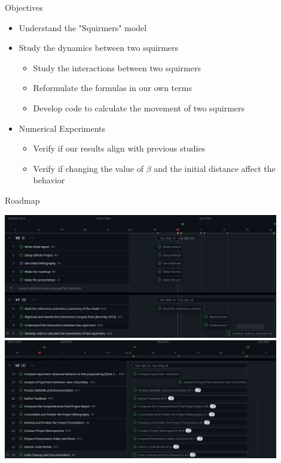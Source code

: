\documentclass{beamer}
\begin{document}
\begin{frame}{Objectives}
    \begin{itemize}
        \item Understand the "Squirmers" model
        \item Study the dynamics between two squirmers
        \begin{itemize}
            \item Study the interactions between two squirmers
            \item Reformulate the formulas in our own terms
            \item Develop code to calculate the movement of two squirmers
        \end{itemize}
        \item Numerical Experiments
        \begin{itemize}
            \item Verify if our results align with previous studies
            \item Verify if changing the value of $\beta$ and the initial distance affect the behavior
        \end{itemize}
    \end{itemize}
\end{frame}

\begin{frame}{Roadmap}
    \begin{center}
        \includegraphics[width=0.9\textwidth]{images/roadmapV0_1.png}
        \vspace{1em} %
        \includegraphics[width=0.9\textwidth]{images/roadmapV0_2.png}
    \end{center}
\end{frame}
\end{document}
